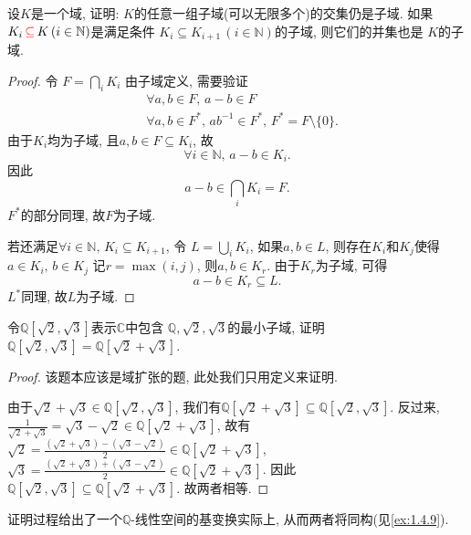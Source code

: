 \begin{problem}
    设$K$是一个域, 证明: $K$的任意一组子域(可以无限多个)的交集仍是子域.
如果$K_i \,\textcolor{red}{\subseteq}\, K \, (i \in \mathbb{N})$是满足条件
$K_i \subseteq K_{i+1} \, (i \in \mathbb{N})$的子域, 则它们的并集也是
$K$的子域.
\end{problem}

\begin{proof}
    令
\(
    F = \bigcap_i K_i
\)
    由子域定义, 需要验证
\[
\begin{aligned}
    &\forall a, b \in F ,\, a - b \in F\\
    &\forall a, b \in F^* ,\, ab^{-1} \in F^*,\, F^* = F \setminus \{0\}.
\end{aligned}
\]
由于$K_i$均为子域, 且$a, b \in F \subseteq K_i$, 故
\[
    \forall i \in \mathbb{N}, \, a - b \in K_i.
\]
因此
\[
    a - b \in \bigcap_i K_i = F.
\]
$F^*$的部分同理, 故$F$为子域.

若还满足$\forall i \in \mathbb{N} ,\, K_i \subseteq K_{i + 1}$,
令
\(
    L = \bigcup_i K_i
\),
如果$a, b \in L$, 则存在$K_i$和$K_j$使得$a \in K_i ,\, b \in K_j$
记$r = \max(i, j)$, 则$a, b \in K_r$. 由于$K_r$为子域, 可得
\[
    a - b \in K_r \subseteq L.
\]
$L^*$同理, 故$L$为子域.
\end{proof}

\begin{problem}
    令$\mathbb{Q}[\sqrt{2}, \sqrt{3}]$表示$\mathbb{C}$中包含
$\mathbb{Q}, \sqrt{2}, \sqrt{3}$的最小子域, 证明
$\mathbb{Q}[\sqrt{2}, \sqrt{3}] = \mathbb{Q}[\sqrt{2} + \sqrt{3}]$.
\end{problem}

\begin{proof}
    该题本应该是域扩张的题, 此处我们只用定义来证明.

    由于$\sqrt{2} + \sqrt{3} \in \mathbb{Q}[\sqrt{2}, \sqrt{3}]$,
我们有$\mathbb{Q}[\sqrt{2} + \sqrt{3}] \subseteq \mathbb{Q}[\sqrt{2}, \sqrt{3}]$.
反过来, 
\(
    \frac{1}{\sqrt{2} + \sqrt{3}} = \sqrt{3} - \sqrt{2} \in \mathbb{Q}[\sqrt{2} + \sqrt{3}]
\),
故有
\(
    \sqrt{2} = \frac{(\sqrt{2} + \sqrt{3}) - (\sqrt{3} - \sqrt{2})}{2} \in \mathbb{Q}[\sqrt{2} + \sqrt{3}]
\),
\(
    \sqrt{3} = \frac{(\sqrt{2} + \sqrt{3}) + (\sqrt{3} - \sqrt{2})}{2} \in \mathbb{Q}[\sqrt{2} + \sqrt{3}]
\).
因此
\(
    \mathbb{Q}[\sqrt{2}, \sqrt{3}] \subseteq \mathbb{Q}[\sqrt{2} + \sqrt{3}]
\).
故两者相等.
\end{proof}

\begin{remark}
    证明过程给出了一个$\mathbb{Q}$-线性空间的基变换实际上, 从而两者将同构(见\ref{ex:1.4.9}).
\end{remark}

